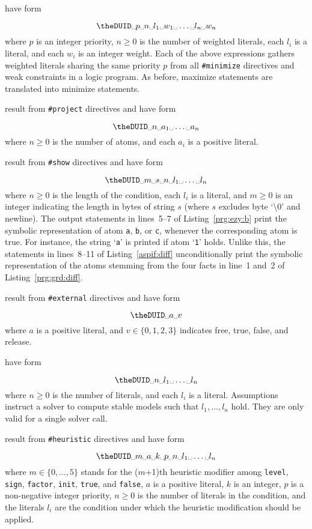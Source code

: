  have form
\addtocounter{DUID}{1}
\[\texttt{\theDUID} \Space p \Space n \Space l_1 \Space w_1 \Space \dots \Space l_n \Space w_n\]
where
$p$ is an integer priority,
$n \geq 0$ is the number of weighted literals,
each $l_i$ is a literal, and
each $w_i$ is an integer weight.
%
Each of the above expressions gathers weighted literals sharing the same priority $p$
from all \lstinline{#minimize} directives and weak constraints in a logic program.
As before, maximize statements are translated into minimize statements.

 result from \lstinline{#project} directives and have form
\addtocounter{DUID}{1}
\[\texttt{\theDUID} \Space n  \Space a_1 \Space \dots \Space a_n\]
where
$n \geq 0$ is the number of atoms, and
each $a_i$ is a positive literal.

 result from \lstinline{#show} directives and have form
\addtocounter{DUID}{1}
\[\texttt{\theDUID} \Space m \Space s \Space n  \Space l_1 \Space \dots \Space l_n\]
where
$n \geq 0$ is the length of the condition,
each $l_i$ is a literal, and
$m\geq0$ is an integer indicating the length in bytes of string $s$
(where $s$ excludes byte `\textbackslash0' and newline).
%
The output statements in lines~5--7 of Listing~\ref{prg:ezy:b} print the symbolic representation of atom
\lstinline{a}, \lstinline{b}, or \lstinline{c}, whenever the corresponding atom is true. %
For instance, the string `\lstinline{a}' is printed  if atom `\lstinline{1}' holds.
Unlike this,
the statements in lines~8--11 of Listing~\ref{aspif:diff} unconditionally print the symbolic representation
of the atoms stemming from the four     facts in line~1 and~2 of Listing~\ref{prg:grd:diff}.

 result from \lstinline{#external} directives and have form
\addtocounter{DUID}{1}
\[\texttt{\theDUID} \Space a \Space v\]
where
$a$ is a positive literal, and
$v \in \{0,1,2,3\}$ indicates free, true, false, and release.

 have form
\addtocounter{DUID}{1}
\[\texttt{\theDUID} \Space n \Space l_1 \Space \dots \Space l_n\]
where
$n\geq 0$ is the number of literals, and
each $l_i$ is a literal.
Assumptions instruct a solver to compute      stable models such that $l_1,\dots,l_n$ hold.
They are only valid for a single solver call.

 result from \lstinline{#heuristic} directives and have form
\addtocounter{DUID}{1}
\[\texttt{\theDUID} \Space m \Space a \Space k \Space p  \Space n  \Space l_1 \Space \dots \Space l_n\]
where
$m\in\{0,\dots,5\}$ stands for the ($m$+1)th heuristic modifier among %
\lstinline{level}, \lstinline{sign}, \lstinline{factor}, \lstinline{init}, \lstinline{true}, and \lstinline{false}, %
$a$ is a positive literal,
$k$ is %
an integer,
$p$ is a non-negative integer priority,
$n \geq 0$ is the number of literals in the condition, and
the literals $l_i$ are the condition under which the heuristic modification should be applied.

